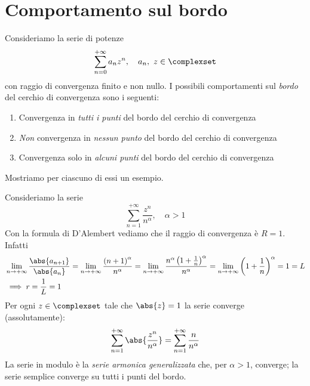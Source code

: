 \section{Comportamento sul bordo}
Consideriamo la serie di potenze
\begin{equation*}
	\sum_{n=0}^{+\infty}a_nz^n,\quad a_n,\ z\in\complexset
\end{equation*}
con raggio di convergenza finito e non nullo.
I possibili comportamenti sul \textit{bordo} del cerchio di convergenza sono i seguenti:
\begin{enumerate}
	\item Convergenza in \textit{tutti i punti} del bordo del cerchio di convergenza
	\item \textit{Non} convergenza in \textit{nessun punto} del bordo del cerchio di convergenza
	\item Convergenza solo in \textit{alcuni punti} del bordo del cerchio di convergenza
\end{enumerate}
Mostriamo per ciascuno di essi un esempio.
\begin{examplewt}[Caso 1]
	Consideriamo la serie
	\begin{equation*}
		\sum_{n=1}^{+\infty}\frac{z^n}{n^\alpha},\quad\alpha>1
	\end{equation*}
	Con la formula di D'Alembert vediamo che il raggio di convergenza è $R=1$. Infatti
	\begin{align*}
		&\lim_{n\to+\infty}\frac{\abs{a_{n+1}}}{\abs{a_{n}}}=\lim_{n\to+\infty}\frac{\left(n+1\right)^\alpha}{n^\alpha}=\lim_{n\to+\infty}\frac{n^\alpha\left(1+\frac{1}{n}\right)^\alpha}{n^\alpha}=\lim_{n\to+\infty}\left(1+\frac{1}{n}\right)^\alpha=1=L\\
		&\implies r=\frac{1}{L}=1
	\end{align*}
	Per ogni $z\in\complexset$ tale che $\abs{z}=1$ la serie converge (assolutamente):
	\begin{equation*}
		\sum_{n=1}^{+\infty}\abs{\frac{z^n}{n^\alpha}}=\sum_{n=1}^{+\infty}\frac{n}{n^\alpha}
	\end{equation*}
	La serie in modulo è la \textit{serie armonica generalizzata} che, per $\alpha>1$, converge; la serie semplice converge su tutti i punti del bordo.
\end{examplewt}
